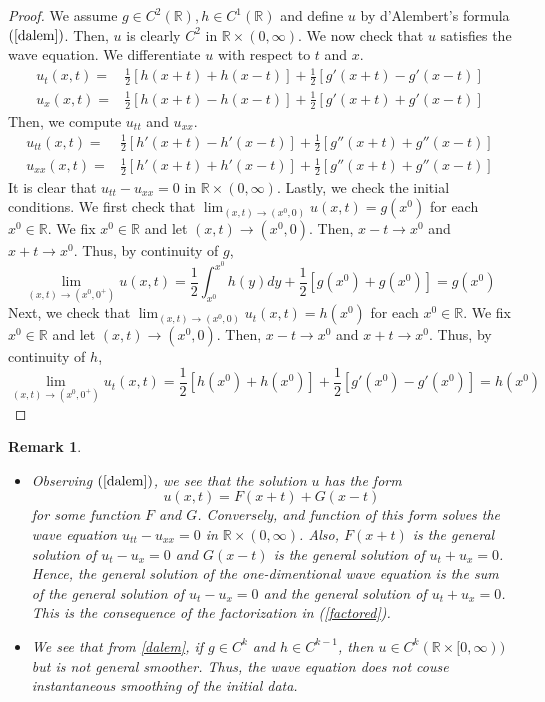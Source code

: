 \documentclass[10pt]{article}
\def\rr{{\mathbb R}}
\newtheorem{remark}{Remark}[section]
\begin{document}
\begin{proof}
    We assume $g \in C^2(\rr), h \in C^1(\rr)$ and define $u$ by d'Alembert's formula $(\ref{dalem})$. Then, $u$ is clearly $C^2$ in $\rr \times (0,\infty)$. We now check that $u$ satisfies the wave equation. We differentiate $u$ with respect to $t$ and $x$.
    \begin{align*}
        u_t(x,t) =& \frac{1}{2}[h(x+t) + h(x-t)] + \frac{1}{2}[g'(x+t) - g'(x-t)]\\
        u_x(x,t) =& \frac{1}{2}[h(x+t) - h(x-t)] + \frac{1}{2}[g'(x+t) + g'(x-t)]
    \end{align*}
    Then, we compute $u_{tt}$ and $u_{xx}$.
    \begin{align*}
        u_{tt}(x,t) =& \frac{1}{2}[h'(x+t) - h'(x-t)] + \frac{1}{2}[g''(x+t) + g''(x-t)]\\
        u_{xx}(x,t) =& \frac{1}{2}[h'(x+t) + h'(x-t)] + \frac{1}{2}[g''(x+t) + g''(x-t)]
    \end{align*}
    It is clear that $u_{tt} - u_{xx} = 0$ in $\rr \times (0,\infty)$. Lastly, we check the initial conditions. We first check that $\lim_{(x,t) \to (x^0,0)} u(x,t) = g(x^0)$ for each $x^0 \in \rr$. We fix $x^0 \in \rr$ and let $(x,t) \to (x^0,0)$. Then, $x-t \to x^0$ and $x+t \to x^0$. Thus, by continuity of $g$,
    \begin{equation*}
        \lim_{(x,t) \to (x^0,0^+)} u(x,t) = \frac{1}{2}\int_{x^0}^{x^0} h(y) dy + \frac{1}{2}[g(x^0) + g(x^0)] = g(x^0)
    \end{equation*}
    Next, we check that $\lim_{(x,t) \to (x^0,0)} u_t(x,t) = h(x^0)$ for each $x^0 \in \rr$. We fix $x^0 \in \rr$ and let $(x,t) \to (x^0,0)$. Then, $x-t \to x^0$ and $x+t \to x^0$. Thus, by continuity of $h$,
    \begin{equation*}
        \lim_{(x,t) \to (x^0,0^+)} u_t(x,t) = \frac{1}{2}[h(x^0) + h(x^0)] + \frac{1}{2}[g'(x^0) - g'(x^0)] = h(x^0)
    \end{equation*}
\end{proof}
\begin{remark}
    \begin{itemize}
        \item [(i)] Observing $(\ref{dalem})$, we see that the solution $u$ has the form
                $$
                u(x,t) = F(x+t) + G(x-t)
                $$
        for some function $F$ and $G$. Conversely, and function of this form solves the wave equation $u_{tt} - u_{xx} = 0$ in $\rr \times (0,\infty)$. Also, $F(x+t)$ is the general solution of $u_t - u_x = 0$ and $G(x-t)$ is the general solution of $u_t + u_x = 0$. Hence, the general solution of the one-dimentional wave equation is the sum of the general solution of $u_t - u_x = 0$ and the general solution of $u_t + u_x = 0$. This is the consequence of the factorization in (\ref{factored}).
        \item [(ii)] We see that from \ref{dalem}, if $ g \in C^k$ and $h \in C^{k-1}$, then $u \in C^k(\rr \times [0,\infty))$ but is not general smoother. Thus, the wave equation does not couse instantaneous smoothing of the initial data.
    \end{itemize}
\end{remark}
\end{document}
